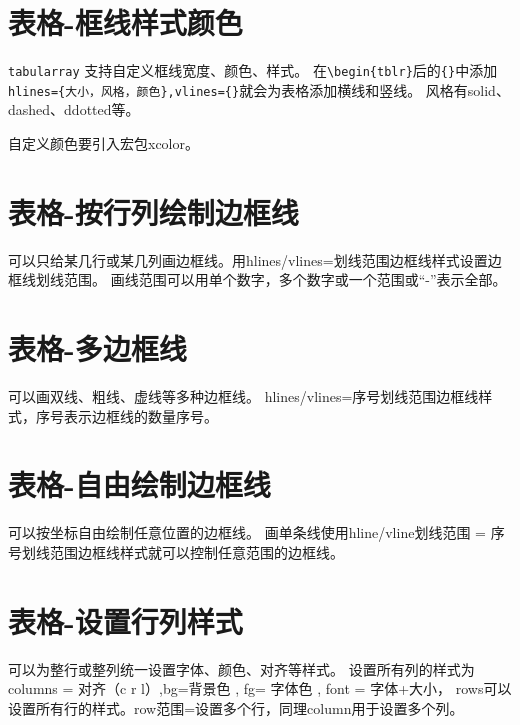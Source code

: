\documentclass[12pt,a4paper]{ctexart}
\begin{document}
\section{表格-框线样式颜色}
\verb|tabularray| 支持自定义框线宽度、颜色、样式。
在\verb|\begin{tblr}|后的\verb|{}|中添加\verb|hlines={大小，风格，颜色},vlines={}|就会为表格添加横线和竖线。
风格有solid、dashed、ddotted等。

自定义颜色要引入宏包xcolor。

\section{表格-按行列绘制边框线}
可以只给某几行或某几列画边框线。用hlines/vlines={划线范围}{边框线样式}设置边框线划线范围。
画线范围可以用单个数字，多个数字或一个范围或“-”表示全部。

\section{表格-多边框线}
可以画双线、粗线、虚线等多种边框线。
hlines/vlines={序号}{划线范围}{边框线样式}，序号表示边框线的数量序号。

\section{表格-自由绘制边框线}
可以按坐标自由绘制任意位置的边框线。
画单条线使用hline/vline{划线范围} = {序号}{划线范围}{边框线样式}就可以控制任意范围的边框线。

\section{表格-设置行列样式}
可以为整行或整列统一设置字体、颜色、对齐等样式。
设置所有列的样式为 columns = {对齐（c r l）,bg=背景色 , fg= 字体色 , font = 字体+大小}，
rows可以设置所有行的样式。row{范围}={}设置多个行，同理column用于设置多个列。
\end{document}
